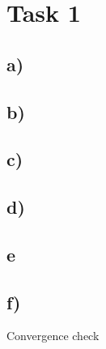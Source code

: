 \documentclass{article}
\begin{document}

\section{Task 1}

\subsection{a)}

\subsection{b)}

\subsection{c)}

\subsection{d)}

\subsection{e}

\subsection{f)}
Convergence check
\end{document}
